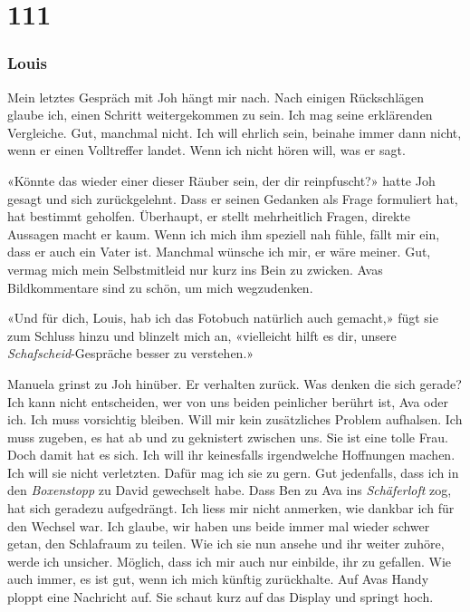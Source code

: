 \chapter{111}

\subsection{Louis}

Mein letztes Gespräch mit Joh hängt mir nach. Nach einigen Rückschlägen
glaube ich, einen Schritt weitergekommen zu sein. Ich mag seine
erklärenden Vergleiche. Gut, manchmal nicht. Ich will ehrlich sein,
beinahe immer dann nicht, wenn er einen Volltreffer landet. Wenn ich nicht
hören will, was er sagt.

«Könnte das wieder einer dieser Räuber sein, der dir reinpfuscht?» hatte
Joh gesagt und sich zurückgelehnt.
Dass er seinen Gedanken als Frage formuliert hat, hat bestimmt geholfen.
Überhaupt, er stellt mehrheitlich Fragen, direkte
Aussagen macht er kaum.
Wenn ich mich ihm speziell nah fühle, fällt mir ein, dass er auch ein Vater ist. Manchmal wünsche ich mir, 
er wäre meiner. Gut, vermag mich mein Selbstmitleid nur kurz ins Bein zu zwicken. Avas
Bildkommentare sind zu schön, um mich wegzudenken.

«Und für dich, Louis, hab ich das Fotobuch natürlich auch gemacht,» fügt
sie zum Schluss hinzu und blinzelt mich an, «vielleicht hilft es dir,
unsere \emph{Schafscheid}-Gespräche besser zu verstehen.»

Manuela grinst zu Joh hinüber. Er verhalten zurück. Was denken die sich
gerade? Ich kann nicht entscheiden, wer von uns beiden peinlicher
berührt ist, Ava oder ich. Ich muss vorsichtig bleiben. Will mir kein
zusätzliches Problem aufhalsen. Ich muss zugeben, es hat ab und zu 
geknistert zwischen uns. Sie ist eine tolle Frau. Doch damit hat es
sich. Ich will ihr keinesfalls irgendwelche Hoffnungen machen. Ich will
sie nicht verletzten. Dafür mag ich sie zu gern. Gut jedenfalls, dass
ich in den \emph{Boxenstopp} zu David gewechselt habe. Dass Ben zu Ava
ins \emph{Schäferloft} zog, hat sich geradezu aufgedrängt. Ich liess
mir nicht anmerken, wie dankbar ich für den Wechsel war. Ich glaube, wir
haben uns beide immer mal wieder schwer getan, den Schlafraum zu teilen.
Wie ich sie nun ansehe und ihr weiter zuhöre, werde ich unsicher.
Möglich, dass ich mir auch nur einbilde, ihr zu gefallen. Wie auch immer, es
ist gut, wenn ich mich künftig zurückhalte.
Auf Avas Handy ploppt eine Nachricht auf. Sie schaut kurz auf das
Display und springt hoch.

